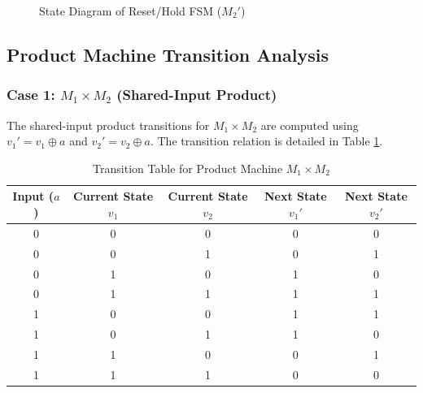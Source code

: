 \documentclass[12pt,a4paper]{article}
\begin{document}
\begin{figure}[h!]
    \centering
    \caption{State Diagram of Reset/Hold FSM ($M_2'$)}
    \label{fig:fsm_m2_prime}
\end{figure}

\subsection{Product Machine Transition Analysis}

\subsubsection{Case 1: $M_1 \times M_2$ (Shared-Input Product)}
The shared-input product transitions for $M_1 \times M_2$ are computed using $v_1' = v_1 \oplus a$ and $v_2' = v_2 \oplus a$. The transition relation is detailed in Table \ref{tab:case1_trans}.

\begin{table}[h!]
    \centering
    \caption{Transition Table for Product Machine $M_1 \times M_2$}
    \label{tab:case1_trans}
    \begin{tabular}{|c|c|c|c|c|}
        \hline
        \textbf{Input ($a$)} & \textbf{Current State $v_1$} & \textbf{Current State $v_2$} & \textbf{Next State $v_1'$} & \textbf{Next State $v_2'$} \\ \hline
        0 & 0 & 0 & 0 & 0 \\ \hline
        0 & 0 & 1 & 0 & 1 \\ \hline
        0 & 1 & 0 & 1 & 0 \\ \hline
        0 & 1 & 1 & 1 & 1 \\ \hline
        1 & 0 & 0 & 1 & 1 \\ \hline
        1 & 0 & 1 & 1 & 0 \\ \hline
        1 & 1 & 0 & 0 & 1 \\ \hline
        1 & 1 & 1 & 0 & 0 \\ \hline
    \end{tabular}
\end{table}
\end{document}
